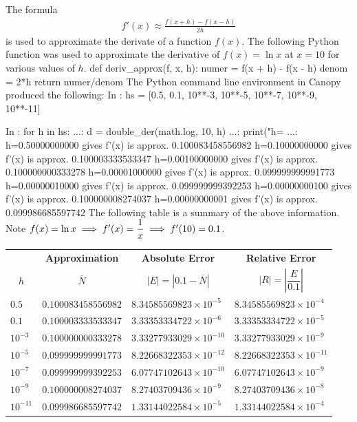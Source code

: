 \documentclass[12pt]{article}
\newenvironment{qv}
{\quote\Verbatim}
{\endVerbatim\endquote}
\begin{document}
The formula
\begin{align*}
f'(x) \approx \frac{f(x + h) - f(x - h)}{2h}
\end{align*}
is used to approximate the derivate of a function $f(x)$.  The following Python function was used to approximate the derivative of $f(x) = \ln x$ at $ x = 10$ for various values of $h$.
\begin{qv}
def deriv_approx(f, x, h):
    numer = f(x + h) - f(x - h)
    denom = 2*h
    return numer/denom
\end{qv}
The Python command line environment in Canopy produced the following:
\begin{qv}
In : hs = [0.5, 0.1, 10**-3, 10**-5, 10**-7, 10**-9, 10**-11]

In : for h in hs:
...:    d = double_der(math.log, 10, h)
...:    print("h=%
...:    
h=0.50000000000 gives f'(x) is approx. 0.100083458556982
h=0.10000000000 gives f'(x) is approx. 0.100003333533347
h=0.00100000000 gives f'(x) is approx. 0.100000000333278
h=0.00001000000 gives f'(x) is approx. 0.099999999991773
h=0.00000010000 gives f'(x) is approx. 0.099999999392253
h=0.00000000100 gives f'(x) is approx. 0.100000008274037
h=0.00000000001 gives f'(x) is approx. 0.099986685597742
\end{qv}
The following table is a summary of the above information.  Note $f(x) = \ln x \\ \implies f'(x) = \dfrac{1}{x} \implies f'(10) = 0.1$.
\begin{table}[H]
    \centering
    \begin{tabular}{|l|l|l|l|}
    & \multicolumn{1}{c|}{\bf Approximation} & \multicolumn{1}{c|}{\bf Absolute Error} & \multicolumn{1}{c|}{\bf Relative Error} \\
    \multicolumn{1}{|c|}{$h$} & \multicolumn{1}{c|}{$\overline{N}$} & \multicolumn{1}{c|}{$|E| = |0.1 - \overline{N}|$} & \multicolumn{1}{c|}{$|R| = \left|\dfrac{E}{0.1}\right|$}\\ [.2cm] \hline
    $0.5$ & $0.100083458556982$ & $8.34585569823\times 10^{-5}$ & $8.34585569823\times10^{-4}$ \\ \hline
    $0.1$ & $0.100003333533347$ & $3.33353334722\times 10^{-6}$ & $3.33353334722\times 10^{-5}$ \\ \hline
    $10^{-3}$ & $0.100000000333278$ & $3.33277933029\times 10^{-10}$ & $3.33277933029\times 10^{-9}$ \\ \hline
    $10^{-5}$ & $0.099999999991773$ & $8.22668322353\times 10^{-12}$ & $8.22668322353\times 10^{-11}$ \\ \hline
    $10^{-7}$ & $0.099999999392253$ & $6.07747102643\times 10^{-10}$ & $6.07747102643\times 10^{-9}$ \\ \hline
    $10^{-9}$ & $0.100000008274037$ & $8.27403709436\times 10^{-9}$ & $8.27403709436\times 10^{-8}$ \\ \hline
    $10^{-11}$ & $0.099986685597742$ & $1.33144022584\times 10^{-5}$ & $1.33144022584\times 10^{-4}$ \\ \hline
    \end{tabular}
\end{table}
\end{document}
